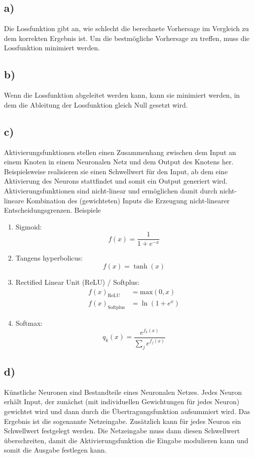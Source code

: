 \documentclass[a4paper, 11pt]{article}
\begin{document}
\subsection*{a)}
Die Lossfunktion gibt an, wie schlecht die berechnete Vorhersage im Vergleich
zu dem korrekten Ergebnis ist.
Um die bestmögliche Vorhersage zu treffen, muss die Lossfunktion minimiert werden.

\subsection*{b)}
Wenn die Lossfunktion abgeleitet werden kann, kann sie minimiert werden, in dem
die Ableitung der Lossfunktion gleich Null gesetzt wird.

\subsection*{c)}
Aktivierungsfunktionen stellen einen Zusammenhang zwischen dem Input an einem
Knoten in einem Neuronalen Netz und dem Output des Knotens her. Beispielsweise
realisieren sie einen Schwellwert für den Input, ab dem eine Aktivierung des
Neurons stattfindet und somit ein Output generiert wird.
Aktivierungsfunktionen sind nicht-linear und ermöglichen damit durch nicht-lineare
Kombination des (gewichteten) Inputs die Erzeugung nicht-linearer Entscheidungsgrenzen.
\newline
Beispiele
\begin{enumerate}
  \item Sigmoid:
   \begin{equation*}
     f(x)=\frac{1}{1+e^{-x}}
   \end{equation*}
  \item Tangens hyperbolicus:
   \begin{equation*}
     f(x)=\tanh(x)
   \end{equation*}
  \item Rectified Linear Unit (ReLU) / Softplus:
   \begin{align*}
     f(x)_\text{ReLU}&=\text{max}(0,x)\\
     f(x)_\text{Softplus}&=\ln\left(1+e^{x}\right)
   \end{align*}
  \item Softmax:
   \begin{equation*}
     q_k(x)=\frac{e^{f_k(x)}}{\sum_j e^{f_j(x)}}
   \end{equation*}
\end{enumerate}

\subsection*{d)}
Künstliche Neuronen sind Bestandteile eines Neuronalen Netzes. Jedes Neuron erhält
Input, der zunächst (mit individuellen Gewichtungen für jedes Neuron) gewichtet
wird und dann durch die Übertragungsfunktion aufsummiert wird. Das Ergebnis ist
die sogenannte Netzeingabe. Zusätzlich kann für jedes Neuron ein Schwellwert
festgelegt werden. Die Netzeingabe muss dann diesen Schwellwert überschreiten,
damit die Aktivierungsfunktion die Eingabe modulieren kann und somit die Ausgabe
festlegen kann.
\end{document}
